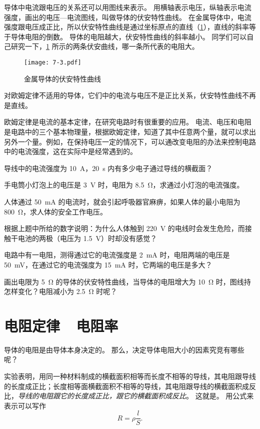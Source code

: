 导体中电流跟电压的关系还可以用图线来表示。
用横轴表示电压，纵轴表示电流强度，画出的电压—电流图线，叫做导体的伏安特性曲线。
在金属导体中，电流强度跟电压成正比，所以伏安特性曲线是通过坐标原点的直线（\cref{fig:7-3}），直线的斜率等于导体电阻的倒数。
导体的电阻越大，伏安特性曲线的斜率越小。
同学们可以自己研究一下，\cref{fig:7-3} 所示的两条伏安曲线，哪一条所代表的电阻大。
\begin{figure}
  \texttt{[image: 7-3.pdf]}
  \caption{金属导体的伏安特性曲线}\label{fig:7-3}
\end{figure}

对欧姆定律不适用的导体，它们中的电流与电压不是正比关系，伏安特性曲线不再是直线。

欧姆定律是电流的基本定律，在研究电路时有很重要的应用。
电流、电压和电阻是电路中的三个基本物理量，根据欧姆定律，知道了其中任意两个量，就可以求出另外一个量。例如，在保持电压一定的情况下，可以通改变电阻的办法来控制电路中的电流强度，这在实际中是经常遇到的。

\begin{Practice}
\begin{question}
  \item 导线中的电流强度为 \qty{10}{A}，\qty{20}{s} 内有多少电子通过导线的横截面？
  \item 手电筒小灯泡上的电压是 \qty{3}{V} 时，电阻为 \qty{8.5}{\ohm}，求通过小灯泡的电流强度。
  \item 人体通过 \qty{50}{mA} 的电流时，就会引起呼吸器官麻痹，如果人体的最小电阻为 \qty{800}{\ohm}，求人体的安全工作电压。
  \item 根据上题中所给的数字说明：为什么人体触到 \qty{220}{V} 的电线时会发生危险，而接触干电池的两极（电压为 \qty{1.5}{V}）时却没有感觉？
  \item 电路中有一电阻，测得通过它的电流强度是 \qty{2}{mA} 时，电阻两端的电压是 \qty{50}{mV}，在通过它的电流强度为 \qty{15}{mA} 时，它两端的电压是多大？
  \item 画出电限为 \qty{5}{\ohm} 的导体的伏安特性曲线，当导体的电阻增大为 \qty{10}{\ohm} 时，图线持怎样变化？电阻减小为 \qty{2.5}{\ohm} 时呢？
\end{question}
\end{Practice}


\section{电阻定律~~电阻率}
导体的电阻是由导体本身决定的。
那么，决定导体电阻大小的因素究竞有哪些呢？

实验表明，用同一种材料制成的横截面积相等而长度不相等的导线，其电阻跟导线的长度成正比；长度相等面横截面积不相等的导线，其电阻跟导线的横截面积成反比，\emph{导线的电阻跟它的长度成正比，跟它的横截面积成反比}。
这就是。
用公式来表示可以写作
\[R=\rho\frac{l}{S}.\]

